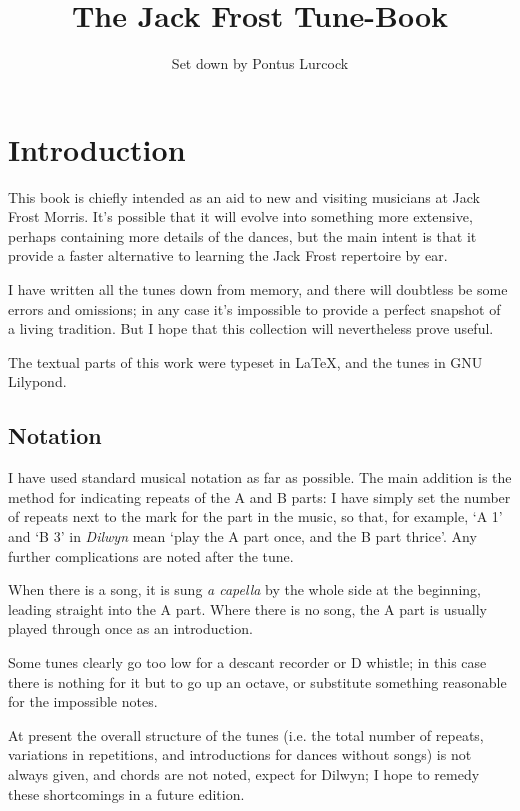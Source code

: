 \documentclass[12pt,a4paper]{article}
\title{The Jack Frost Tune-Book}
\author{\small Set down by Pontus Lurcock}
\begin{document}
\maketitle
\samepage

\section*{Introduction}

This book is chiefly intended as an aid to new and visiting musicians
at Jack Frost Morris. It's possible that it will evolve into something
more extensive, perhaps containing more details of the dances, but the
main intent is that it provide a faster alternative to learning the
Jack Frost repertoire by ear.

I have written all the tunes down from memory, and there will
doubtless be some errors and omissions; in any case it's impossible to
provide a perfect snapshot of a living tradition. But I hope that this
collection will nevertheless prove useful.

The textual parts of this work were typeset in \LaTeX{}, and the tunes
in GNU Lilypond.

\subsection*{Notation}

I have used standard musical notation as far as possible. The main
addition is the method for indicating repeats of the A and B parts: I
have simply set the number of repeats next to the mark for the part in
the music, so that, for example, `A 1' and `B 3'  in {\it Dilwyn} mean
`play the A part once, and the B part thrice'. Any further
complications are noted after the tune.

When there is a song, it is sung {\it a capella} by the whole side at
the beginning, leading straight into the A part. Where there is no
song, the A part is usually played through once as an introduction.

Some tunes clearly go too low for a descant recorder or D whistle; in
this case there is nothing for it but to go up an octave, or
substitute something reasonable for the impossible notes.

At present the overall structure of the tunes (i.e. the total number
of repeats, variations in repetitions, and introductions for dances
without songs) is not always given, and chords are not noted, expect
for Dilwyn; I hope to remedy these shortcomings in a future edition.
\end{document}
